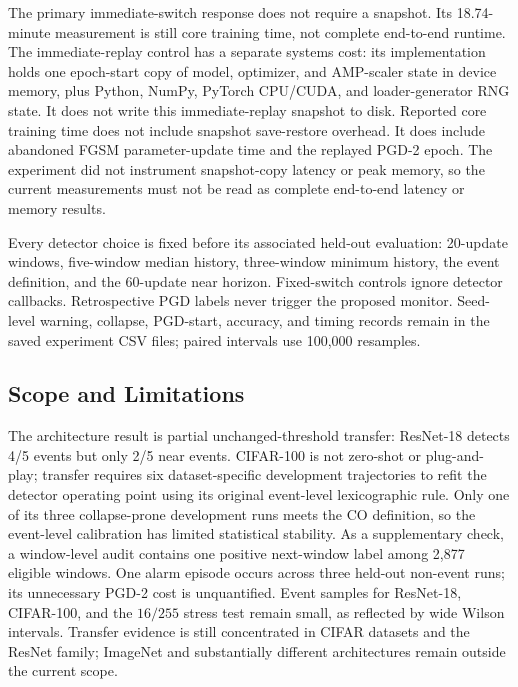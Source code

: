The primary immediate-switch response does not require a snapshot. Its 18.74-minute
measurement is still core training time, not complete end-to-end runtime. The
immediate-replay control has a separate systems cost: its implementation holds one
epoch-start copy of model, optimizer, and AMP-scaler state in device memory,
plus Python, NumPy, PyTorch CPU/CUDA, and loader-generator RNG state. It does
not write this immediate-replay snapshot to disk. Reported core training time does not
include snapshot save-restore overhead. It does include abandoned FGSM
parameter-update time and the replayed PGD-2 epoch. The experiment did not
instrument snapshot-copy latency or peak memory, so the current measurements
must not be read as complete end-to-end latency or memory results.

Every detector choice is fixed before its associated held-out evaluation:
20-update windows, five-window median history, three-window minimum history,
the event definition, and the 60-update near horizon. Fixed-switch controls
ignore detector callbacks. Retrospective PGD labels never trigger the proposed
monitor. Seed-level warning, collapse, PGD-start, accuracy, and timing records
remain in the saved experiment CSV files; paired intervals use 100,000 resamples.

\subsection{Scope and Limitations}
The architecture result is partial unchanged-threshold transfer: ResNet-18
detects 4/5 events but only 2/5 near events. CIFAR-100 is not zero-shot or
plug-and-play; transfer requires six dataset-specific development trajectories
to refit the detector operating point using its original event-level
lexicographic rule. Only one of its three collapse-prone development runs meets
the CO definition, so the event-level calibration has limited statistical
stability. As a supplementary check, a window-level audit contains one positive
next-window label among 2,877 eligible windows. One alarm episode
occurs across three held-out non-event runs; its unnecessary PGD-2 cost is
unquantified.
Event samples for ResNet-18, CIFAR-100, and the
$16/255$ stress test remain small, as reflected by wide Wilson intervals.
Transfer evidence is still concentrated in CIFAR datasets and the ResNet
family; ImageNet and substantially different architectures remain outside the
current scope.

